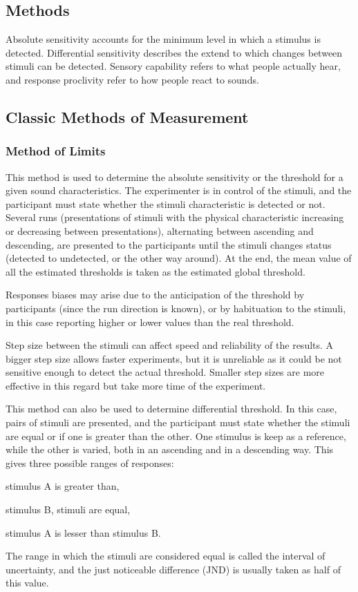 \documentclass[../main.tex]{subfiles}
\begin{document}
\begin{theoreticalbackground}
\section{Methods}

Absolute sensitivity accounts for the minimum level in which a stimulus is
detected. Differential sensitivity describes the extend to which changes between
stimuli can be detected. Sensory capability refers to what people actually hear,
and response proclivity refer to how people react to sounds.

\subsection{Classic Methods of Measurement}

\subsubsection{Method of Limits}

This method is used to determine the absolute sensitivity or the threshold for a
given sound characteristics. The experimenter is in control of the stimuli, and
the participant must state whether the stimuli characteristic is detected or
not. Several runs (presentations of stimuli with the physical characteristic
increasing or decreasing between presentations), alternating between ascending
and descending, are presented to the participants until the stimuli changes
status (detected to undetected, or the other way around). At the end, the mean
value of all the estimated thresholds is taken as the estimated global
threshold.

Responses biases may arise due to the anticipation of the threshold by
participants (since the run direction is known), or by habituation to the
stimuli, in this case reporting higher or lower values than the real threshold.

Step size between the stimuli can affect speed and reliability of the results.
A bigger step size allows faster experiments, but it is unreliable as it could
be not sensitive enough to detect the actual threshold. Smaller step sizes are
more effective in this regard but take more time of the experiment.

This method can also be used to determine differential threshold. In this case,
pairs of stimuli are presented, and the participant must state whether the
stimuli are equal or if one is greater than the other. One stimulus is keep as a
reference, while the other is varied, both in an ascending and in a descending
way. This gives three possible ranges of responses:
\begin{inparaenum}[(i)]
    \item stimulus A is greater than,
    \item stimulus B, stimuli are equal,
    \item stimulus A is lesser than stimulus B.
\end{inparaenum}
The range in which the stimuli are considered equal is called the interval of
uncertainty, and the just noticeable difference (JND) is usually taken as half
of this value.


\end{theoreticalbackground}
\end{document}
